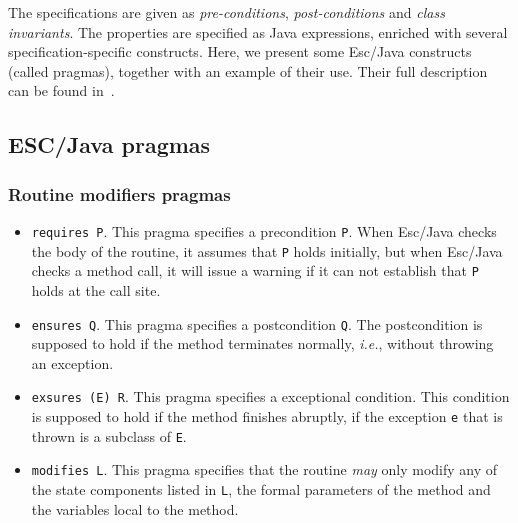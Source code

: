 \documentclass[a4paper]{llncs}
\begin{document}
The specifications are given as
\textit{pre-conditions}, \textit{post-conditions} and \textit{class
invariants}. The properties are specified as Java expressions,
enriched with several specification-specific constructs. Here, we
present some Esc/Java constructs (called pragmas), together with an
example of their use. Their full description can be found
in~\cite{LeinoNS00}.

\subsection{ESC/Java pragmas}
\subsubsection{Routine modifiers pragmas}
\begin{itemize}
\item{\texttt{requires P}.}
This pragma specifies a precondition {\tt P}.
When Esc/Java checks the body of the
routine, it assumes that \texttt{P} holds initially, but when
Esc/Java checks a method call, it will issue a warning if
it can not establish that \texttt{P} holds at the call site.

\item{\texttt{ensures Q}.}
This pragma specifies a postcondition \texttt{Q}. The postcondition 
is supposed to hold if the method terminates normally, \emph{i.e.},
without throwing an exception.

\item{\texttt{exsures (E) R}.}
This pragma specifies a exceptional condition. This condition is
supposed to hold if the method finishes abruptly, if
the exception \texttt{e} that is thrown is a subclass of \texttt{E}.

\item{\texttt{modifies L}.}
This pragma specifies that the routine \emph{may} only modify any of
the state components listed in \texttt{L}, the formal parameters of
the method and the variables local to the method.
\end{itemize}
\end{document}
